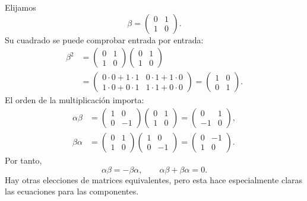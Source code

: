 Elijamos
\begin{equation}
\beta=
\begin{pmatrix}
0&1\\
1&0
\end{pmatrix}.
\end{equation}
Su cuadrado se puede comprobar entrada por entrada:
\begin{equation}
\begin{aligned}
\beta^2
&=
\begin{pmatrix}
0&1\\
1&0
\end{pmatrix}
\begin{pmatrix}
0&1\\
1&0
\end{pmatrix}\\
&=
\begin{pmatrix}
0\cdot0+1\cdot1&0\cdot1+1\cdot0\\
1\cdot0+0\cdot1&1\cdot1+0\cdot0
\end{pmatrix}
=
\begin{pmatrix}
1&0\\
0&1
\end{pmatrix}.
\end{aligned}
\end{equation}
El orden de la multiplicación importa:
\begin{align}
\alpha\beta
&=
\begin{pmatrix}
1&0\\
0&-1
\end{pmatrix}
\begin{pmatrix}
0&1\\
1&0
\end{pmatrix}
=
\begin{pmatrix}
0&1\\
-1&0
\end{pmatrix},\\
\beta\alpha
&=
\begin{pmatrix}
0&1\\
1&0
\end{pmatrix}
\begin{pmatrix}
1&0\\
0&-1
\end{pmatrix}
=
\begin{pmatrix}
0&-1\\
1&0
\end{pmatrix}.
\end{align}
Por tanto,
\begin{equation}
\alpha\beta=-\beta\alpha,
\qquad
\alpha\beta+\beta\alpha=0.
\end{equation}
Hay otras elecciones de matrices equivalentes, pero esta hace especialmente claras las ecuaciones para las componentes.

